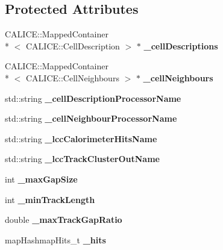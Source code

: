 \subsection*{Protected Attributes}
\begin{DoxyCompactItemize}
\item 
C\-A\-L\-I\-C\-E\-::\-Mapped\-Container\\*
$<$ C\-A\-L\-I\-C\-E\-::\-Cell\-Description $>$ $\ast$ {\bfseries \-\_\-cell\-Descriptions}\label{classHCalTrackingNNProcessor_ab99634a7a2381df856fc03dfc9a14746}

\item 
C\-A\-L\-I\-C\-E\-::\-Mapped\-Container\\*
$<$ C\-A\-L\-I\-C\-E\-::\-Cell\-Neighbours $>$ $\ast$ {\bfseries \-\_\-cell\-Neighbours}\label{classHCalTrackingNNProcessor_a98c62324557cb29ccee95c4732a7ed8e}

\item 
std\-::string {\bfseries \-\_\-cell\-Description\-Processor\-Name}\label{classHCalTrackingNNProcessor_af925574ee11b92a6cb68e40a54847256}

\item 
std\-::string {\bfseries \-\_\-cell\-Neighbour\-Processor\-Name}\label{classHCalTrackingNNProcessor_a3b30cd8461ceb63cd4eaa06f72fce463}

\item 
std\-::string {\bfseries \-\_\-lcc\-Calorimeter\-Hits\-Name}\label{classHCalTrackingNNProcessor_acd02724e047ef7709b106763df328c61}

\item 
std\-::string {\bfseries \-\_\-lcc\-Track\-Cluster\-Out\-Name}\label{classHCalTrackingNNProcessor_a552a2ae2175dd0b2d25ad7614bb1b13d}

\item 
int {\bfseries \-\_\-max\-Gap\-Size}\label{classHCalTrackingNNProcessor_a5727d97f52617147f667c5687c54c4e5}

\item 
int {\bfseries \-\_\-min\-Track\-Length}\label{classHCalTrackingNNProcessor_a50f6eb654cede963c96bfc3595409ff1}

\item 
double {\bfseries \-\_\-max\-Track\-Gap\-Ratio}\label{classHCalTrackingNNProcessor_a185318818a7bf21116b05d1ed05230db}

\item 
map\-Hashmap\-Hits\-\_\-t {\bfseries \-\_\-hits}\label{classHCalTrackingNNProcessor_a5454f68399fd7edce4d63ef7d7ff2b45}


\end{DoxyCompactItemize}
